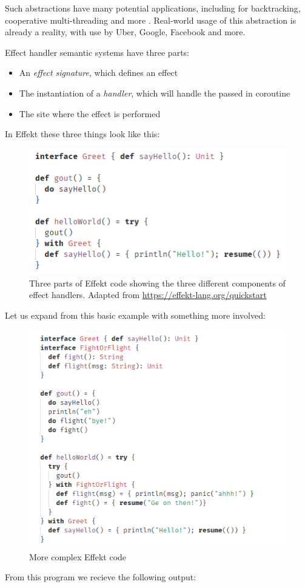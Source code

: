 \documentclass[logo,bsc,singlespacing,parskip,online]{infthesis}
\begin{document}
Such abstractions have many potential applications, including for backtracking, cooperative multi-threading and more \citep{effect_handlers_tutorial}. Real-world usage of this abstraction is already a reality, with use by Uber, Google, Facebook and more. \citep{impact_study}

Effect handler semantic systems have three parts:
\begin{itemize}
\item An \textit{effect signature}, which defines an effect
\item The instantiation of a \textit{handler}, which will handle the passed in coroutine
\item The site where the effect is performed
\end{itemize}

In Effekt \citep{effekt-paper} these three things look like this:

\begin{figure}[ht]
    \centering
    \includegraphics[width=0.5\linewidth]{basic_demo.png}
    \caption{Three parts of Effekt code showing the three different components of effect handlers. Adapted from \url{https://effekt-lang.org/quickstart}}
    \label{fig:basic}
\end{figure}

Let us expand from this basic example with something more involved:

\begin{figure}[ht]
    \centering
    \includegraphics[width=0.9\linewidth]{effekt_2.png}
    \caption{More complex Effekt code}
    \label{fig:efkt2}
\end{figure}
\pagebreak
From this program we recieve the following output:
\end{document}
